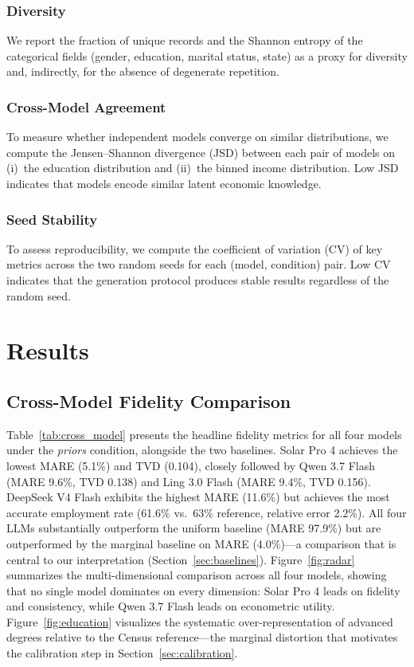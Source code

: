 \documentclass[11pt]{article}
\begin{document}
\subsubsection{Diversity}
We report the fraction of unique records and the Shannon entropy of the categorical fields (gender, education, marital status, state) as a proxy for diversity and, indirectly, for the absence of degenerate repetition.

\subsubsection{Cross-Model Agreement}
To measure whether independent models converge on similar distributions, we compute the Jensen--Shannon divergence (JSD) between each pair of models on (i)~the education distribution and (ii)~the binned income distribution.
Low JSD indicates that models encode similar latent economic knowledge.

\subsubsection{Seed Stability}
To assess reproducibility, we compute the coefficient of variation (CV) of key metrics across the two random seeds for each (model, condition) pair.
Low CV indicates that the generation protocol produces stable results regardless of the random seed.

\section{Results}
\label{sec:results}

\subsection{Cross-Model Fidelity Comparison}

Table~\ref{tab:cross_model} presents the headline fidelity metrics for all four models under the \emph{priors} condition, alongside the two baselines.
Solar Pro 4 achieves the lowest MARE (5.1\%) and TVD (0.104), closely followed by Qwen 3.7 Flash (MARE 9.6\%, TVD 0.138) and Ling 3.0 Flash (MARE 9.4\%, TVD 0.156).
DeepSeek V4 Flash exhibits the highest MARE (11.6\%) but achieves the most accurate employment rate (61.6\% vs.\ 63\% reference, relative error 2.2\%).
All four LLMs substantially outperform the uniform baseline (MARE 97.9\%) but are outperformed by the marginal baseline on MARE (4.0\%)---a comparison that is central to our interpretation (Section~\ref{sec:baselines}).
Figure~\ref{fig:radar} summarizes the multi-dimensional comparison across all four models, showing that no single model dominates on every dimension: Solar Pro 4 leads on fidelity and consistency, while Qwen 3.7 Flash leads on econometric utility.
Figure~\ref{fig:education} visualizes the systematic over-representation of advanced degrees relative to the Census reference---the marginal distortion that motivates the calibration step in Section~\ref{sec:calibration}.
\end{document}
